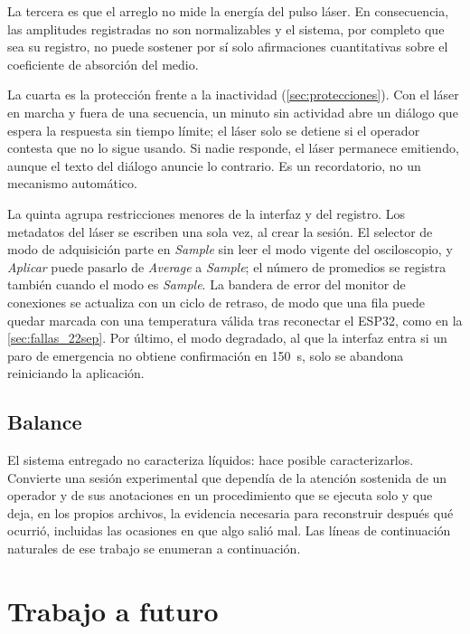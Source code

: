 La tercera es que el arreglo no mide la energía del pulso láser. En
consecuencia, las amplitudes registradas no son normalizables y el
sistema, por completo que sea su registro, no puede sostener por sí
solo afirmaciones cuantitativas sobre el coeficiente de absorción del
medio.

La cuarta es la protección frente a la inactividad
(\cref{sec:protecciones}). Con el láser en
marcha y fuera de una secuencia, un minuto sin actividad abre un
diálogo que espera la respuesta sin tiempo límite; el láser solo se
detiene si el operador contesta que no lo sigue usando. Si nadie
responde, el láser permanece emitiendo, aunque el texto del diálogo
anuncie lo contrario. Es un recordatorio, no un mecanismo automático.

La quinta agrupa restricciones menores de la interfaz y del registro.
Los metadatos del láser se escriben una sola vez, al crear la sesión.
El selector de modo de adquisición parte en \textit{Sample} sin leer el
modo vigente del osciloscopio, y \textit{Aplicar} puede pasarlo de
\textit{Average} a \textit{Sample}; el número de promedios se registra
también cuando el modo es \textit{Sample}. La bandera de error del
monitor de conexiones se actualiza con un ciclo de retraso, de modo que
una fila puede quedar marcada con una temperatura válida tras reconectar
el ESP32, como en la \cref{sec:fallas_22sep}. Por último, el modo
degradado, al que la interfaz entra si un paro de emergencia no obtiene
confirmación en \SI{150}{\second}, solo se abandona reiniciando la
aplicación.

\subsection*{Balance}

El sistema entregado no caracteriza líquidos: hace posible
caracterizarlos. Convierte una sesión experimental que dependía de la
atención sostenida de un operador y de sus anotaciones en un
procedimiento que se ejecuta solo y que deja, en los propios archivos,
la evidencia necesaria para reconstruir después qué ocurrió, incluidas
las ocasiones en que algo salió mal. Las líneas de continuación
naturales de ese trabajo se enumeran a continuación.

\section{Trabajo a futuro}
\label{sec:trabajo_futuro}

